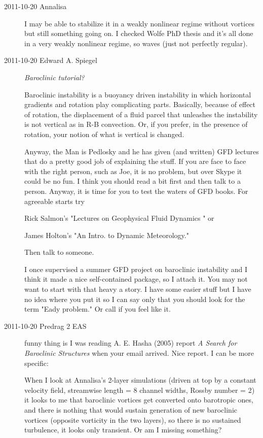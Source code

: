\begin{description}
\item[2011-10-20 Annalisa]
I may be able to stabilize it in a weakly nonlinear regime without
vortices but still something going on. I checked Wolfe PhD thesis and
it's all done in a very weakly nonlinear regime, so waves (just not
perfectly regular).

\item[2011-10-20 Edward A. Spiegel] {\em Baroclinic tutorial?}
	
Baroclinic instability is a buoyancy driven instability in which horizontal
gradients and rotation play complicating parts.   Basically, because of
effect of rotation, the displacement of a fluid parcel that unleashes
the instability is not vertical as in R-B convection.  Or, if you prefer,
in the presence of rotation, your notion of what is vertical is changed.

Anyway, the Man is Pedlosky and he has given (and written) GFD lectures
that do a pretty good job of explaining the stuff.  If you are face to face
with the right person, such as Joe, it is no problem, but over Skype it
could be no fun.  I think you should read a bit first and then talk to a
person.
Anyway, it is time for you to test the waters of GFD books.  For agreeable
starts try

Rick Salmon's "Lectures on Geophysical Fluid Dynamics " or

James Holton's "An Intro. to Dynamic Meteorology."

Then talk to someone.

I once supervised a summer GFD project on baroclinic instability
and I think it made a nice self-contained package, so I attach it.
You may not want to start with that heavy a story.  I have some
easier stuff but I have no idea where you put it so I can say only
that you should look for the term "Eady problem."  Or call if you
feel like it.

\item[2011-10-20 Predrag 2 EAS]
funny thing is I was reading
{A. E. Hasha} (2005) report \emph{A Search for Baroclinic Structures}
when your email arrived. Nice report. I can be more specific:

When I look at Annalisa's 2-layer simulations (driven at top by
a constant velocity field, streamwise length = 8 channel widths,
Rossby number = 2) it looks to me that baroclinic vortices get
converted onto barotropic ones, and there is nothing that would
sustain generation of new baroclinic vortices (opposite vorticity
in the two layers), so there is no sustained turbulence, it looks only
transient. Or am I missing something?


\end{description}
